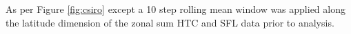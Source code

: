 \label{fig:csiro_supp}
As per Figure \ref{fig:csiro} except a 10 step rolling mean window was applied along the latitude dimension of the zonal sum HTC and SFL data prior to analysis. 